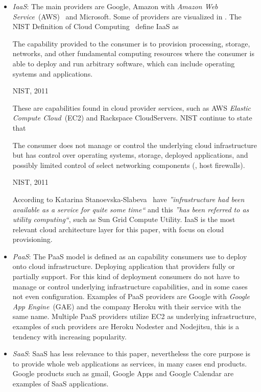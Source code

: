\begin{itemize}
  \item \emph{IaaS}: 
    The main providers are Google, Amazon with \emph{Amazon Web Service}~(AWS)~\cite{aws} and Microsoft.
    Some of providers are visualized in .
    The NIST Definition of Cloud Computing~\cite{nist:mell11} define IaaS as
    \epigraph{The capability provided to the consumer is to provision 
      processing, storage, networks, and other fundamental computing resources where the 
      consumer is able to deploy and run arbitrary software, which can include operating 
      systems and applications.}{NIST, 2011}
    These are capabilities found in cloud provider services, 
    such as AWS \emph{Elastic Compute Cloud}~(EC2) and Rackspace CloudServers.
    NIST continue to state that 
    \epigraph{The consumer does not manage or control the underlying cloud 
      infrastructure but has control over operating systems, storage, deployed applications, and 
      possibly limited control of select networking components (\eg, host firewalls).}{NIST, 2011}
    According to Katarina Stanoevska-Slabeva~\cite{introduction:wozniak10} have 
    \emph{''infrastructure had been available as a service for quite some time``} and this 
    \emph{''has been referred to as utility computing``}, such as Sun Grid Compute Utility.
    IaaS is the most relevant cloud architecture layer for this paper, with focus
    on cloud provisioning.
  \item \emph{PaaS}:
    The PaaS model is defined as an capability consumers use to deploy onto cloud infrastructure.
    Deploying application that providers fully or partially support. For this kind of deployment
    consumers do not have to manage or control underlying infrastructure capabilities,
    and in some cases not even configuration.
    Examples of PaaS providers are Google with \emph{Google App Engine}~(GAE) and
    the company Heroku with their service with the same name.
    Multiple PaaS providers utilize EC2 as underlying infrastructure, examples of such
    providers are Heroku Nodester and Nodejitsu, this is a tendency with increasing popularity.
  \item \emph{SaaS}:
    SaaS has less relevance to this paper, nevertheless the core purpose
    is to provide whole web applications as services, in many cases end products.
    Google products such as gmail, Google Apps and  Google Calendar are examples of 
    SaaS applications.
\end{itemize}

